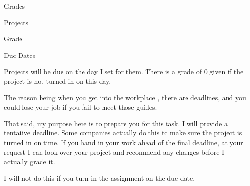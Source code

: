 \documentclass[ignorenonframetext,]{beamer}
\begin{document}
\begin{frame}{Grades}
\begin{block}{Projects}
\begin{block}{Grade}
\end{block}

\begin{block}{Due Dates}

Projects will be due on the day I set for them. There is a grade of 0
given if the project is not turned in on this day.

The reason being when you get into the workplace , there are deadlines,
and you could lose your job if you fail to meet those guides.

That said, my purpose here is to prepare you for this task. I will
provide a tentative deadline. Some companies actually do this to make
sure the project is turned in on time. If you hand in your work ahead of
the final deadline, at your request I can look over your project and
recommend any changes before I actually grade it.

I will not do this if you turn in the assignment on the due date.

\end{block}

\end{block}

\end{frame}
\end{document}
